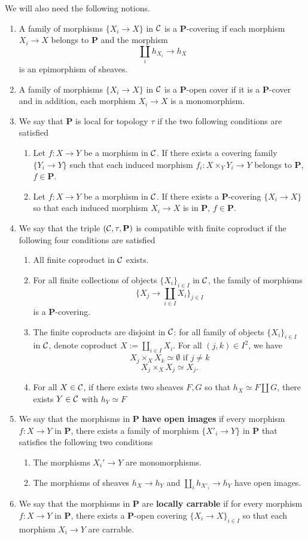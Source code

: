 \documentclass{tufte-book} %
\numberwithin{dummy}{section}
\newcommand{\calc}{{\cal C}}
\newcommand{\lrta}{\longrightarrow}
\newcommand{\bfp}{\mathbf{P}}
\begin{document}
We will also need the following notions.
\begin{enumerate}
\item A family of morphisms $\{X_i\lrta X\}$ in $\calc$ is a $\bfp$-covering if each morphism $X_i\lrta X$ belongs to $\bfp$ and the morphism
$$
\coprod_i h_{X_i}\lrta h_X
$$
is an epimorphism of sheaves.
\item A family of morphisms $\{X_i\lrta X\}$ in $\calc$ is a $\bfp$-open cover if it is a $\bfp$-cover and in addition, each morphism $X_i\lrta X$ is a monomorphism.
\item We say that $\bfp$ is local for topology $\tau$ if the two following conditions are satisfied
\begin{enumerate}[label=(\alph*)]
\item Let $f:X\lrta Y$ be a morphism in $\calc$. If there exists a covering family $\{Y_i\lrta Y\}$ such that each induced morphism $f_i:X\times_Y Y_i\lrta Y$ belongs to $\bfp$, $f\in\bfp$.
\item Let $f:X\lrta Y$ be a morphism in $\calc$. If there exists a $\bfp$-covering $\{X_i\lrta X\}$ so that each induced morphism $X_i\lrta X$ is in $\bfp$, $f\in \bfp$.
\end{enumerate}
\item We say that the triple $(\calc,\tau,\bfp)$ is compatible with finite coproduct if the following four conditions are satisfied
\begin{enumerate}[label=(\alph*)]
\item All finite coproduct in $\calc$ exists.
\item For all finite collections of objects $\{X_i\}_{i\in I}$ in $\calc$, the family of morphisms
$$
\{X_j\lrta\coprod_{i\in I}X_i\}_{j\in I}
$$
is a $\bfp$-covering.
\item The finite coproducts are disjoint in $\calc$: for all family of objects $\{X_i\}_{i\in I}$ in $\calc$, denote coproduct $X:=\coprod_{i\in I}X_i$. For all $(j,k)\in I^2$, we have
$$
X_j\times_X X_k\simeq \emptyset \text{ if }j\neq k
$$
$$
X_j\times_X X_j\simeq X_j.
$$
\item For all $X\in\calc$, if there exists two sheaves $F,G$ so that $h_X\simeq F\coprod G$, there exists $Y\in \calc$ with $h_Y\simeq F$
\end{enumerate}
\item We say that the morphisms in $\bfp$ \textbf{have open images} if every morphism $f:X\lrta Y$ in $\bfp$, there exists a family of morphism $\{X'_i\lrta Y\}$ in $\bfp$ that satisfies the following two conditions
\begin{enumerate}[label=(\alph*)]
\item The morphisms $X_i'\lrta Y$ are monomorphisms.
\item The morphisms of sheaves $h_X\lrta h_Y$ and $\coprod_i h_{X'_i}\lrta h_Y$ have open images.
  \end{enumerate}
\item We say that the morphisms in $\bfp$ are \textbf{locally carrable} if for every morphism $f:X\lrta Y$ in $\bfp$, there exists a $\bfp$-open covering $\{X_i\lrta X\}_{i\in I}$ so that each morphism $X_i\lrta Y$ are carrable.
\end{enumerate}
\end{document}

